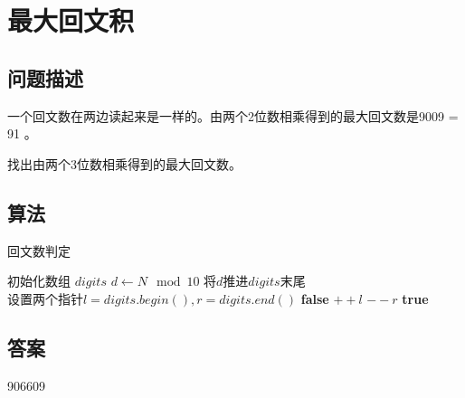 \section{最大回文积}\label{sec:problem04}
\subsection{问题描述}
\begin{tcolorbox}
	一个回文数在两边读起来是一样的。由两个2位数相乘得到的最大回文数是9009 = 91 。

	找出由两个3位数相乘得到的最大回文数。
\end{tcolorbox}

\subsection{算法}
\begin{algorithm}
	\caption{回文数判定}
	\begin{algorithmic}[1]
		\State 初始化数组 $digits$
		\State $d \gets N \mod 10$
		\State $将d推进digits末尾$
		\EndWhile
		\State $设置两个指针 l=digits.begin(), r = digits.end()$
		\Return \textbf{false}
		\EndIf
		\State $++l$
		\State $--r$
		\EndWhile
		\Return \textbf{true}
		\EndFunction
	\end{algorithmic}
\end{algorithm}

\subsection{答案}
906609
